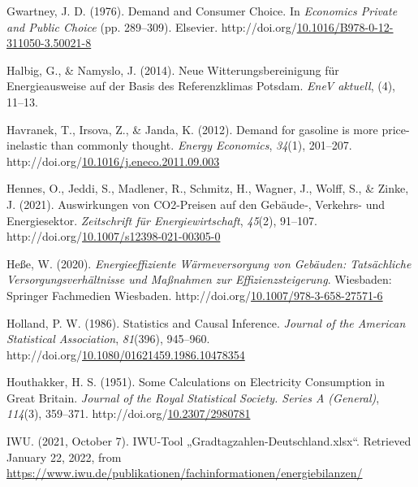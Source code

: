 \documentclass[12pt,twoside]{reedthesis}
\newlength{\cslhangindent}
\newenvironment{CSLReferences}[2] %
 {%
  \setlength{\parindent}{0pt}
  \ifodd #1 \everypar{\setlength{\hangindent}{\cslhangindent}}\ignorespaces\fi
  \ifnum #2 > 0
  \setlength{\parskip}{#2\baselineskip}
  \fi
 }%
 {}
\begin{document}
\begin{CSLReferences}{1}{0}
\leavevmode{}%
Gwartney, J. D. (1976). Demand and Consumer Choice. In \emph{Economics Private and Public Choice} (pp. 289--309). Elsevier. http://doi.org/\href{https://doi.org/10.1016/B978-0-12-311050-3.50021-8}{10.1016/B978-0-12-311050-3.50021-8}

\leavevmode{}%
Halbig, G., \& Namyslo, J. (2014). Neue Witterungsbereinigung für Energieausweise auf der Basis des Referenzklimas Potsdam. \emph{EneV aktuell}, (4), 11--13.

\leavevmode{}%
Havranek, T., Irsova, Z., \& Janda, K. (2012). Demand for gasoline is more price-inelastic than commonly thought. \emph{Energy Economics}, \emph{34}(1), 201--207. http://doi.org/\href{https://doi.org/10.1016/j.eneco.2011.09.003}{10.1016/j.eneco.2011.09.003}

\leavevmode{}%
Hennes, O., Jeddi, S., Madlener, R., Schmitz, H., Wagner, J., Wolff, S., \& Zinke, J. (2021). Auswirkungen von CO2-Preisen auf den Gebäude‑, Verkehrs- und Energiesektor. \emph{Zeitschrift für Energiewirtschaft}, \emph{45}(2), 91--107. http://doi.org/\href{https://doi.org/10.1007/s12398-021-00305-0}{10.1007/s12398-021-00305-0}

\leavevmode{}%
Heße, W. (2020). \emph{Energieeffiziente Wärmeversorgung von Gebäuden: Tatsächliche Versorgungsverhältnisse und Maßnahmen zur Effizienzsteigerung}. Wiesbaden: Springer Fachmedien Wiesbaden. http://doi.org/\href{https://doi.org/10.1007/978-3-658-27571-6}{10.1007/978-3-658-27571-6}

\leavevmode{}%
Holland, P. W. (1986). Statistics and Causal Inference. \emph{Journal of the American Statistical Association}, \emph{81}(396), 945--960. http://doi.org/\href{https://doi.org/10.1080/01621459.1986.10478354}{10.1080/01621459.1986.10478354}

\leavevmode{}%
Houthakker, H. S. (1951). Some Calculations on Electricity Consumption in Great Britain. \emph{Journal of the Royal Statistical Society. Series A (General)}, \emph{114}(3), 359--371. http://doi.org/\href{https://doi.org/10.2307/2980781}{10.2307/2980781}

\leavevmode{}%
IWU. (2021, October 7). IWU-Tool „Gradtagzahlen-Deutschland.xlsx``. Retrieved January 22, 2022, from \url{https://www.iwu.de/publikationen/fachinformationen/energiebilanzen/}


\end{CSLReferences}
\end{document}

